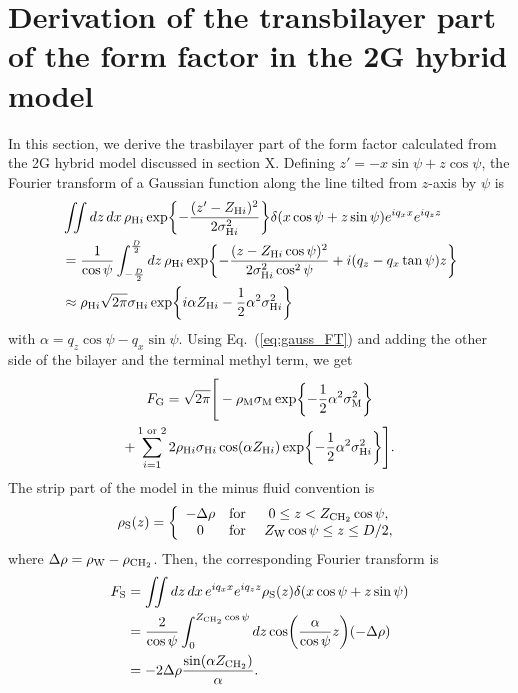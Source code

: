 \section{Derivation of the transbilayer part of the form factor in the 2G hybrid model}\label{app:FT}
In this section, we derive the trasbilayer part of the form factor calculated
from the 2G hybrid model discussed in section X.
Defining $z'=-x\sin\psi+z\cos\psi$, the Fourier transform of a Gaussian function 
along the line tilted from $z$-axis by $\psi$ is
\begin{align}
  & \iint\mathop{dz}\mathop{dx} \rho_{\mathrm{H}i} \exp\mathopen{}\left\lbrace -\frac{(z'-Z_{\mathrm{H}i})^2}{2\sigma_{\mathrm{H}i}^2} \right\rbrace\mathclose{}
  \delta(x\cos\psi+z\sin\psi)e^{iq_xx}e^{iq_zz} \nonumber\\
  &= \frac{1}{\cos\psi}\int_{-\frac{D}{2}}^{\frac{D}{2}}\mathop{dz} \rho_{\mathrm{H}i} \exp\mathopen{}\left\lbrace 
    -\frac{(z-Z_{\mathrm{H}i}\cos\psi)^2}{2\sigma_{\mathrm{H}i}^2\cos^2\psi} + i(q_z-q_x\tan\psi)z
   \right\rbrace\mathclose{} \nonumber \\
  &\approx \rho_{\mathrm{H}i}\sqrt{2\pi}\sigma_{\mathrm{H}i} \,\mathrm{exp}
  \mathopen{}\left\lbrace 
    i\alpha Z_{\mathrm{H}i} - \frac{1}{2}\alpha^2\sigma_{\mathrm{H}i}^2
   \right\rbrace\mathclose{} \label{eq:gauss_FT}
\end{align}
with $\alpha=q_z\cos\psi-q_x\sin\psi$.
Using Eq.~(\ref{eq:gauss_FT}) and adding the other side of the bilayer and
the terminal methyl term, we get
\begin{multline}
  F_\mathrm{G} = \sqrt{2\pi}
  \Bigg[
    -\rho_\mathrm{M}\sigma_\mathrm{M} \exp\mathopen{}\left\lbrace 
      -\frac{1}{2}\alpha^2\sigma_\mathrm{M}^2
     \right\rbrace\mathclose{} \\
    + \sum_{i=1}^{1\text{ or }2}2\rho_{\mathrm{H}i}\sigma_{\mathrm{H}i}
    \cos(\alpha Z_{\mathrm{H}i})
    \,\mathrm{exp}\mathopen{}\left\lbrace -\frac{1}{2}\alpha^2\sigma_{\mathrm{H}i}^2 \right\rbrace\mathclose{}
  \Bigg].
\end{multline}
The strip part of the 
model in the minus fluid convention is
\begin{equation}
  \rho_\mathrm{S}(z) = \left\{
    \begin{array}{ccc}
      -\Delta\rho & \text{for } & 0 \leq z < Z_\mathrm{CH_2}\cos\psi, \\
      0   & \text{for } & Z_\mathrm{W}\cos\psi \leq z \leq D/2,
    \end{array}
  \right.
\end{equation}
where $\Delta\rho=\rho_\mathrm{W}-\rho_\mathrm{CH_2}$.
Then, the corresponding Fourier transform is 
\begin{align}
  F_\mathrm{S} 
  &= \iint\mathop{dz}\mathop{dx} e^{iq_xx}e^{iq_zz} \rho_\mathrm{S}(z)\delta(x\cos\psi+z\sin\psi) \nonumber\\
  &= \frac{2}{\cos\psi} \int_0^{Z_\mathrm{CH_2}\cos\psi}\mathop{dz}\cos\mathopen{}\left( \frac{\alpha}{\cos\psi} z \right)\mathclose{}(-\Delta\rho) \nonumber\\
  &= -2\Delta\rho\frac{\sin(\alpha Z_\mathrm{CH_2})}{\alpha}.
\end{align} 
